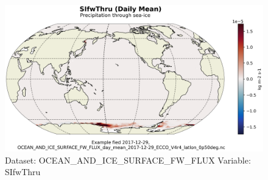 \begin{figure}[H]
\centering
\includegraphics[scale=0.55]{../images/plots/latlon_plots/Ocean_and_Sea-Ice_Surface_Freshwater_Fluxes/SIfwThru.png}
\caption{Dataset: OCEAN\_AND\_ICE\_SURFACE\_FW\_FLUX Variable: SIfwThru}
\label{tab:table-OCEAN_AND_ICE_SURFACE_FW_FLUX_SIfwThru-Plot}
\end{figure}
\pagebreak
